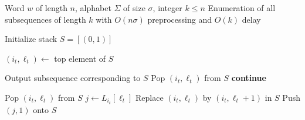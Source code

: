 \documentclass[10pt,a4paper]{amsart}
\theoremstyle{plain}
\theoremstyle{definition}
\begin{document}
%
%
%
\begin{algorithm}
\caption{Enumerate Subsequences of Length $k$}
\begin{algorithmic}[1]
\Require Word $w$ of length $n$, alphabet $\Sigma$ of size $\sigma$, integer $k \leq n$
\Ensure Enumeration of all subsequences of length $k$ with $O(n\sigma)$ preprocessing and $O(k)$ delay

\State Initialize stack $S = [(0,1)]$ 

    \State $(i_t, \ell_t) \gets$ top element of $S$
    
     
        \State Output subsequence corresponding to $S$
        \State Pop $(i_t, \ell_t)$ from $S$
        \State \textbf{continue}
    \EndIf

        \State Pop $(i_t, \ell_t)$ from $S$ 
    \Else
        \State $j \gets L_{i_t}[\ell_t]$ 
        \State Replace $(i_t, \ell_t)$ by $(i_t, \ell_t + 1)$ in $S$
        \State Push $(j, 1)$ onto $S$
    \EndIf
\EndWhile
\end{algorithmic}
\end{algorithm}
\end{document}
